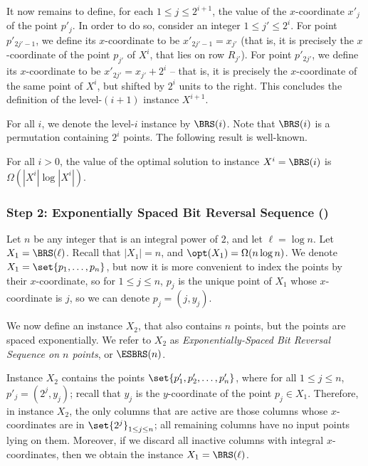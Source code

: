 It now remains to define, for each $1\leq j\leq 2^{i+1}$, the value of the $x$-coordinate $x'_j$ of the point $p'_j$. In order to do so, consider an integer $1\leq j'\leq 2^{i}$. For point $p'_{2j'-1}$, we define its $x$-coordinate to be $x'_{2j'-1}=x_{j'}$ (that is, it is precisely the $x$-coordinate of the point $p_{j'}$ of $X^i$, that lies on row $R_{j'}$). For point $p'_{2j'}$, we define its $x$-coordinate to be $x'_{2j'}=x_{j'}+2^i$ -- that is, it is precisely the $x$-coordinate of the same point of $X^i$, but shifted by $2^i$ units to the right.
This concludes the definition of the level-$(i+1)$ instance $X^{i+1}$. 

For all $i$, we denote the level-$i$ instance by $\BRS(i)$. Note that $\BRS(i)$ is a permutation containing $2^i$ points.
The following result is well-known.   
 

\begin{claim}\label{claim: large opt for BRS}
	For all $i>0$, the value of the optimal solution to instance $X^i=\BRS(i)$ is $\Omega(|X^i|\log |X^i|)$.
\end{claim}


%
%
%
\subsubsection{Step 2: Exponentially Spaced Bit Reversal Sequence (\ESBRS)}
%
%
%


%

Let $n$ be any integer that is an integral power of $2$, and let $\ell=\log n$. Let $X_1=\BRS(\ell)$. Recall that $|X_1|=n$, and  $\opt(X_1)=\Omega(n\log n)$. We denote $X_1=\set{p_1,\ldots,p_n}$, but now it is more convenient to index the points by their $x$-coordinate, so for $1\leq j\leq n$, $p_j$ is the unique point of $X_1$ whose $x$-coordinate is $j$, so we can denote $p_j=(j,y_j)$.

We now define an instance $X_2$, that also contains $n$ points, but the points are spaced exponentially.
We refer to $X_2$ as \emph{Exponentially-Spaced Bit Reversal Sequence on $n$ points}, or $\ESBRS(n)$.

Instance $X_2$ contains the points $\set{p'_1,p'_2,\ldots,p'_n}$, where  for all $1\leq j\leq n$, $p'_j=(2^j,y_j)$; recall that $y_j$ is the $y$-coordinate of the point $p_j\in X_1$. Therefore, in instance $X_2$, the only columns that are active are those columns whose $x$-coordinates are in $\set{2^j}_{1\leq j\leq n}$; all remaining columns have no input points lying on them. Moreover, if we discard all inactive columns with integral $x$-coordinates, then we obtain the instance $X_1=\BRS(\ell)$.

